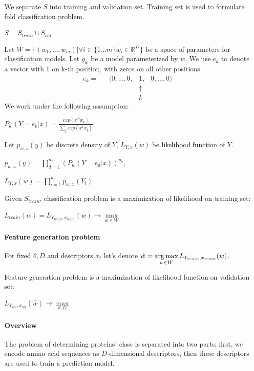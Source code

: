 \documentclass[12pt, twoside]{article}
\begin{document}
We separate $S$ into training and validation set. Training set is used to formulate fold classification problem.  

$S = S_{train} \cup S_{val}$

Let $W = \{(w_1, ..., w_m)| \forall i \in \{1...m\} w_i \in \mathbb{R}^D\}$ be a space of parameters for classification models. Let $g_w$ be a model parameterized by $w$.
We use $e_k$ to denote a vector with 1 on k-th position, with zeros on all other positions.
\[
\begin{matrix}
e_{k} = &
        &(0,\ldots,0,&1,&0,\dots,0)\\
        &&&\uparrow&      \\
        &&&k&           
\end{matrix}
\]
We work under the following assumption:  

$P_w(Y = e_k| x) = \frac{exp(x^Tw_k)}{\sum_j exp(x^t w_j)}$

Let $p_{w, x}(y)$ be discrete density of $Y$, $L_{Y, x}(w)$ be likelihood function of $Y$.  

$p_{w, x}(y) = \prod_{d = 1}^{m} (P_w(Y = e_d| x))^{y_d}$, 

$L_{Y, x}(w) = \prod_{i = 1}^{n} p_{w, x}(Y_i)$

Given $S_{train}$, classification problem is a maximization of likelihood on training set: 

$L_{train}(w) = L_{Y_{train}, x_{train}}(w) \rightarrow \max\limits_{w \in W}$

\paragraph{Feature generation problem}
\noindent

For fixed $\theta, D$ and descriptors $x_i$ let's denote $\hat{w} = \argmax\limits_{w \in W} L_{Y_{train}, x_{train}}(w)$.  

Feature generation problem is a maximization of likelihood function on validation set:  

$L_{Y_{val}, x_{val}}(\hat{w}) \rightarrow \max\limits_{\theta, D}$

\paragraph{Overview}
\noindent

The problem of determining proteins' class is separated into two parts: first, we encode amino acid sequences as $D$-dimensional descriptors, then these descriptors are used to train a prediction model.  
\end{document}
